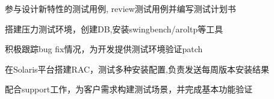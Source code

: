 \documentclass[]{deedy-resume-openfont}
\begin{document}
\begin{minipage}[t]{0.73\textwidth}
\begin{tightemize}
    \item 参与设计新特性的测试⽤例, review测试⽤例并编写测试计划书
    \item 搭建压⼒测试环境，创建DB,安装swingbench/aroltp等工具
    \item 积极跟踪bug fix情况，为开发提供测试环境验证patch
    \end{tightemize}
\sectionsep

\begin{tightemize}
    \item 在Solaris平台搭建RAC，测试多种安装配置,负责发送每周版本安装结果
    \item 配合support工作，为客户需求构建测试场景，并完成基本功能验证
    \end{tightemize}
\sectionsep





\end{minipage}
\end{document}
